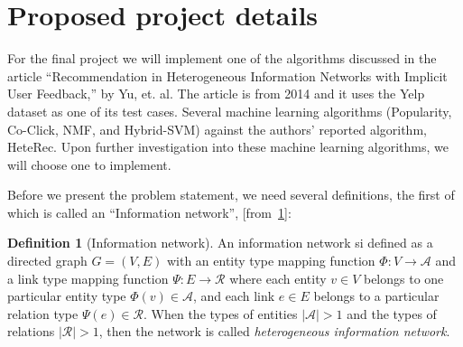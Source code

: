 \documentclass{article}
\theoremstyle{plain}
\theoremstyle{definition}
\newtheorem{defn}{Definition}[section]
\theoremstyle{remark}
\begin{document}
 


\section{Proposed project details}
For the final project we will implement one of the algorithms discussed in the article ``Recommendation in Heterogeneous Information Networks with Implicit User Feedback,'' by Yu, et. al. The article is from 2014 and it uses the Yelp dataset as one of its test cases. Several machine learning algorithms (Popularity, Co-Click, NMF, and Hybrid-SVM) against the authors' reported algorithm, HeteRec. Upon further investigation into these machine learning algorithms, we will choose one to implement.

Before we present the problem statement, we need several definitions, the first of which is called an ``Information network'', [from~\ref{}]:


\begin{defn}[Information network]
An information network si defined as a directed graph $G = (V,E)$ with an entity type mapping function $\Phi:V \rightarrow \mathcal{A}$ and a link type mapping function $\Psi : E\rightarrow \mathcal{R}$ where each entity $v\in V$ belongs to one particular entity type $\Phi(v)\in \mathcal{A}$, and each link $e \in E$ belongs to a particular relation type $\Psi(e) \in \mathcal{R}$. When the types of entities $|\mathcal{A}| > 1$ and the types of relations $|\mathcal{R}| > 1$, then the network is called \textit{heterogeneous information network}.
\end{defn}
\end{document}
